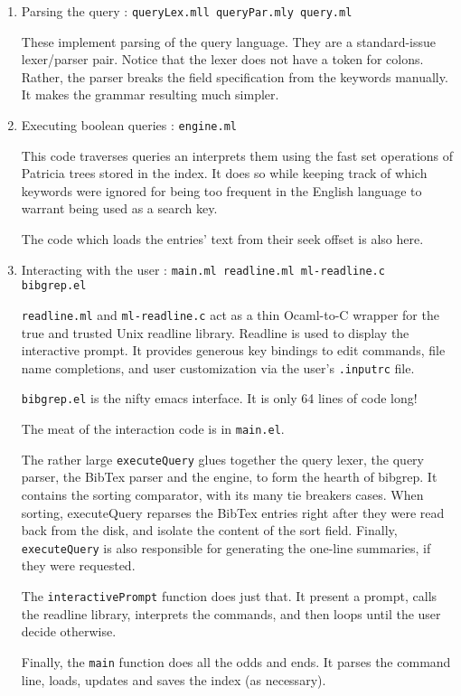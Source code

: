 \documentclass[11pt]{article}
\begin{document}
\begin{enumerate}
\item Parsing the query : {\tt queryLex.mll queryPar.mly query.ml}

  These implement parsing of the query language. They are a
  standard-issue lexer/parser pair. Notice that the lexer does not
  have a token for colons. Rather, the parser breaks the field
  specification from the keywords manually. It makes the grammar
  resulting much simpler.

\item Executing boolean queries : {\tt engine.ml }

  This code traverses queries an interprets them using the fast set
  operations of Patricia trees stored in the index. It does so while
  keeping track of which keywords were ignored for being too frequent
  in the English language to warrant being used as a search key.

  The code which loads the entries' text from their seek offset is
  also here.
  
\item Interacting with the user : {\tt main.ml readline.ml
                                   ml-readline.c bibgrep.el }

  {\tt readline.ml} and {\tt ml-readline.c} act as a thin Ocaml-to-C
  wrapper for the true and trusted Unix readline library. Readline is
  used to display the interactive prompt. It provides generous key
  bindings to edit commands, file name completions, and user
  customization via the user's {\tt .inputrc} file.

  {\tt bibgrep.el} is the nifty emacs interface. It is only 64 lines
  of code long!
  
  The meat of the interaction code is in {\tt main.el}. 

  The rather large {\tt executeQuery} glues together the query lexer,
  the query parser, the BibTex parser and the engine, to form the
  hearth of bibgrep. It contains the sorting comparator, with its many
  tie breakers cases. When sorting, executeQuery reparses the BibTex
  entries right after they were read back from the disk, and isolate
  the content of the sort field. Finally, {\tt executeQuery} is also
  responsible for generating the one-line summaries, if they were
  requested.

  The {\tt interactivePrompt} function does just that. It present a
  prompt, calls the readline library, interprets the commands, and
  then loops until the user decide otherwise.

  Finally, the {\tt main} function does all the odds and ends. It parses the
  command line, loads, updates and saves the index (as necessary).
  

\end{enumerate}
\end{document}
